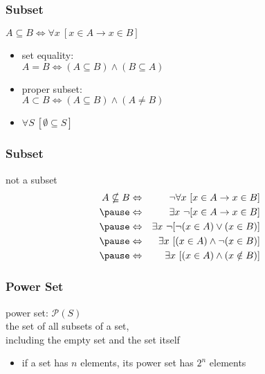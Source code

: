 \documentclass[dvipsnames]{beamer}
\begin{document}
\begin{frame}
  \frametitle{Subset}

  \begin{definition}
    $A \subseteq B \Leftrightarrow \forall x~[x \in A \rightarrow x \in B]$
  \end{definition}

  \pause
  \begin{itemize}
    \item \alert{set equality}:\\
      $A = B \Leftrightarrow (A \subseteq B) \wedge (B \subseteq A)$

    \pause
    \item \alert{proper subset}:\\
      $A \subset B \Leftrightarrow (A \subseteq B) \wedge (A \neq B)$

    \pause
    \item $\forall S~[\emptyset \subseteq S]$
  \end{itemize}
\end{frame}

\begin{frame}
  \frametitle{Subset}

  \begin{block}{not a subset}
    \begin{eqnarray*}
      A \nsubseteq B & \Leftrightarrow
                     & \neg \forall x~[x \in A \rightarrow x \in B]\\\pause
                     & \Leftrightarrow
                     & \exists x~\neg [x \in A \rightarrow x \in B]\\\pause
                     & \Leftrightarrow
                     & \exists x~\neg [\neg (x \in A) \vee (x \in B)]\\\pause
                     & \Leftrightarrow
                     & \exists x~[(x \in A) \wedge \neg (x \in B)]\\\pause
                     & \Leftrightarrow
                     & \exists x~[(x \in A) \wedge (x \notin B)]
    \end{eqnarray*}
  \end{block}
\end{frame}

\begin{frame}
  \frametitle{Power Set}

  \begin{definition}
    \alert{power set}: $\mathcal{P}(S)$\\
    the set of all subsets of a set,\\
    including the empty set and the set itself
  \end{definition}

  \pause
  \begin{itemize}
    \item if a set has $n$ elements, its power set has $2^n$ elements
  \end{itemize}
\end{frame}
\end{document}
